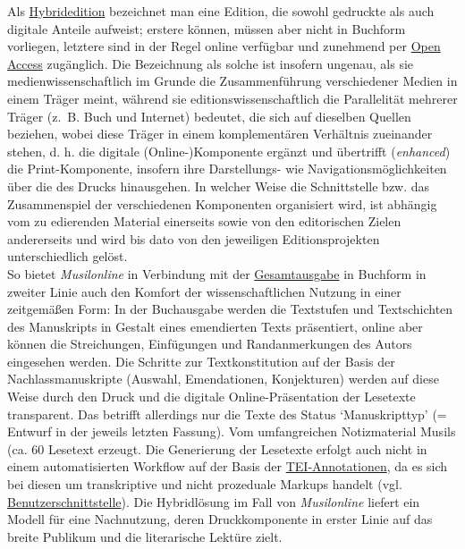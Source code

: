 \documentclass{article}
\begin{document}
    Als \href{http://gams.uni-graz.at/o:konde.96}{Hybridedition} bezeichnet man
                  eine Edition, die sowohl gedruckte als auch digitale Anteile aufweist; erstere
                  können, müssen aber nicht in Buchform vorliegen, letztere sind in der Regel online
                  verfügbar und zunehmend per \href{http://gams.uni-graz.at/o:konde.152}{Open
                     Access} zugänglich. Die Bezeichnung als solche ist insofern ungenau, als
                  sie medienwissenschaftlich im Grunde die Zusammenführung verschiedener Medien in
                  einem Träger meint, während sie editionswissenschaftlich die Parallelität mehrerer
                  Träger (z. B. Buch und Internet) bedeutet, die sich auf dieselben Quellen
                  beziehen, wobei diese Träger in einem komplementären Verhältnis zueinander stehen,
                  d. h. die digitale (Online-)Komponente ergänzt und übertrifft (\emph{enhanced}) die Print-Komponente, insofern ihre Darstellungs- wie
                  Navigationsmöglichkeiten über die des Drucks hinausgehen. In welcher Weise die
                  Schnittstelle bzw. das Zusammenspiel der verschiedenen Komponenten organisiert
                  wird, ist abhängig vom zu edierenden Material einerseits sowie von den
                  editorischen Zielen andererseits und wird bis dato von den jeweiligen
                  Editionsprojekten unterschiedlich gelöst.\\
            
        So bietet \emph{Musilonline} in Verbindung mit der \href{http://gams.uni-graz.at/o:konde.91}{Gesamtausgabe} in Buchform in zweiter
                  Linie auch den Komfort der wissenschaftlichen Nutzung in einer zeitgemäßen Form:
                  In der Buchausgabe werden die Textstufen und Textschichten des Manuskripts in
                  Gestalt eines emendierten Texts präsentiert, online aber können die Streichungen,
                  Einfügungen und Randanmerkungen des Autors eingesehen werden. Die Schritte zur
                  Textkonstitution auf der Basis der Nachlassmanuskripte (Auswahl, Emendationen,
                  Konjekturen) werden auf diese Weise durch den Druck und die digitale
                  Online-Präsentation der Lesetexte transparent. Das betrifft allerdings nur die
                  Texte des Status ‘Manuskripttyp’ (= Entwurf in der jeweils letzten Fassung). Vom
                  umfangreichen Notizmaterial Musils (ca. 60 %
                  Lesetext erzeugt. Die Generierung der Lesetexte erfolgt auch nicht in einem
                  automatisierten Workflow auf der Basis der \href{http://gams.uni-graz.at/o:konde.17}{TEI-Annotationen}, da es sich bei diesen um
                  transkriptive und nicht prozeduale Markups handelt (vgl. \href{http://gams.uni-graz.at/o:konde.18}{Benutzerschnittstelle}). Die Hybridlösung im Fall von
                     \emph{Musilonline} liefert ein Modell für eine Nachnutzung,
                  deren Druckkomponente in erster Linie auf das breite Publikum und die literarische
                  Lektüre zielt.\\
            
\end{document}
